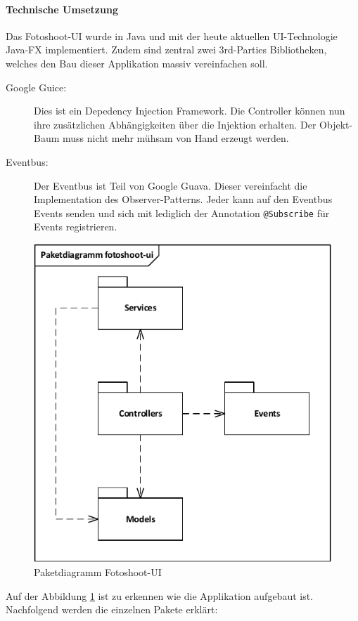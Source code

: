 \paragraph{Technische Umsetzung}
Das Fotoshoot-UI wurde in Java und mit der heute aktuellen UI-Technologie Java-FX implementiert. Zudem sind zentral zwei 3rd-Parties Bibliotheken, welches den Bau dieser Applikation massiv vereinfachen soll.

\begin{description}
	\item[Google Guice:] Dies ist ein Depedency Injection Framework. Die Controller können nun ihre zusätzlichen Abhängigkeiten über die Injektion erhalten. Der Objekt-Baum muss nicht mehr mühsam von Hand erzeugt werden.
	\item[Eventbus:] Der Eventbus ist Teil von Google Guava. Dieser vereinfacht die Implementation des Observer-Patterns. Jeder kann auf den Eventbus Events senden und sich mit lediglich der Annotation \texttt{@Subscribe} für Events registrieren.
\end{description}
\begin{figure}[h!]
	\centering
	\includegraphics[width=0.4\linewidth]{../../fig/fotoshoot-ui/fotoshoot-ui-paketdiagramm}
	\caption{Paketdiagramm Fotoshoot-UI}
	\label{fig:fotoshoot-ui-paketdiagramm}
\end{figure}
Auf der Abbildung \ref{fig:fotoshoot-ui-paketdiagramm} ist zu erkennen wie die Applikation aufgebaut ist. Nachfolgend werden die einzelnen Pakete erklärt:
		
